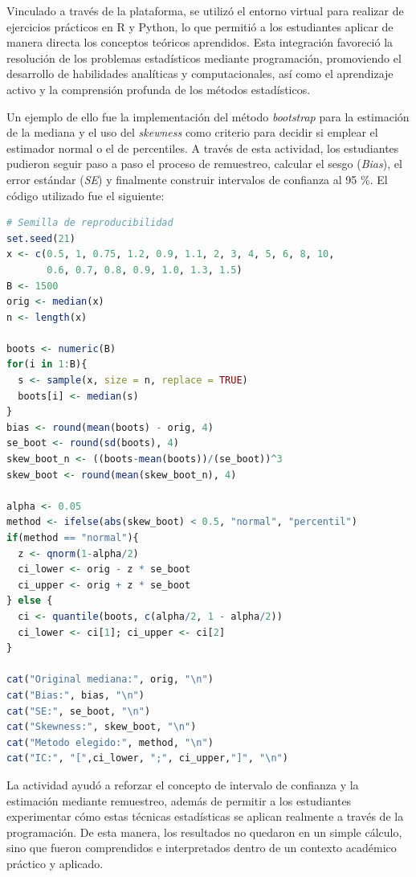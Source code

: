 \documentclass[letter,oneside,12pt,spanish]{report}
\begin{document}
\newpage

Vinculado a través de la plataforma, se utilizó el entorno virtual para realizar de ejercicios prácticos en R y Python, lo que permitió a los estudiantes aplicar de manera directa los conceptos teóricos aprendidos. Esta integración favoreció la resolución de los problemas estadísticos mediante programación, promoviendo el desarrollo de habilidades analíticas y computacionales, así como el aprendizaje activo y la comprensión profunda de los métodos estadísticos.

Un ejemplo de ello fue la implementación del método \textit{bootstrap} para la estimación de la mediana y el uso del \textit{skewness} como criterio para decidir si emplear el estimador normal o el de percentiles. A través de esta actividad, los estudiantes pudieron seguir paso a paso el proceso de remuestreo, calcular el sesgo (\textit{Bias}), el error estándar (\textit{SE}) y finalmente construir intervalos de confianza al 95 \%. El código utilizado fue el siguiente:

\renewcommand{\lstlistingname}{Código}
\begin{lstlisting}[language=R, caption={Implementación del método Bootstrap en R}]
# Semilla de reproducibilidad
set.seed(21)
x <- c(0.5, 1, 0.75, 1.2, 0.9, 1.1, 2, 3, 4, 5, 6, 8, 10, 
       0.6, 0.7, 0.8, 0.9, 1.0, 1.3, 1.5)
B <- 1500
orig <- median(x)
n <- length(x)

boots <- numeric(B)
for(i in 1:B){
  s <- sample(x, size = n, replace = TRUE)
  boots[i] <- median(s)
}
bias <- round(mean(boots) - orig, 4)
se_boot <- round(sd(boots), 4)
skew_boot_n <- ((boots-mean(boots))/(se_boot))^3
skew_boot <- round(mean(skew_boot_n), 4)

alpha <- 0.05
method <- ifelse(abs(skew_boot) < 0.5, "normal", "percentil")
if(method == "normal"){
  z <- qnorm(1-alpha/2)
  ci_lower <- orig - z * se_boot
  ci_upper <- orig + z * se_boot
} else {
  ci <- quantile(boots, c(alpha/2, 1 - alpha/2))
  ci_lower <- ci[1]; ci_upper <- ci[2]
}

cat("Original mediana:", orig, "\n")
cat("Bias:", bias, "\n")
cat("SE:", se_boot, "\n")
cat("Skewness:", skew_boot, "\n")
cat("Metodo elegido:", method, "\n")
cat("IC:", "[",ci_lower, ";", ci_upper,"]", "\n")
\end{lstlisting}

La actividad ayudó a reforzar el concepto de intervalo de confianza y la estimación mediante remuestreo, además de permitir a los estudiantes experimentar cómo estas técnicas estadísticas se aplican realmente a través de la programación. De esta manera, los resultados no quedaron en un simple cálculo, sino que fueron comprendidos e interpretados dentro de un contexto académico práctico y aplicado.
\end{document}
